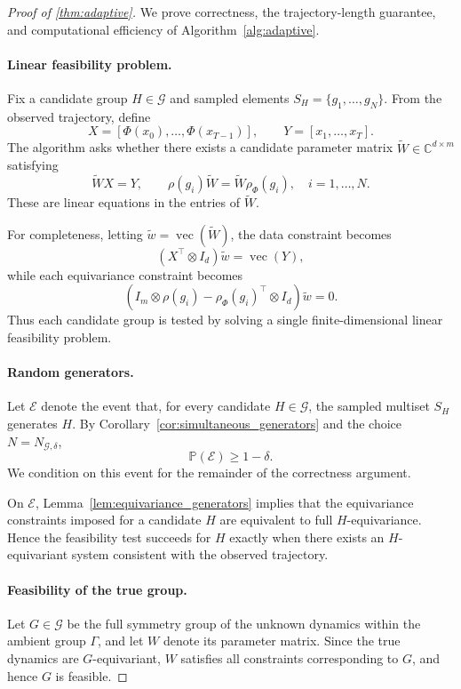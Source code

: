 \documentclass[11pt]{article}
\theoremstyle{plain}
\theoremstyle{definition}
\theoremstyle{remark}
\begin{document}
\begin{proof}[Proof of \cref{thm:adaptive}]
We prove correctness, the trajectory-length guarantee, and computational
efficiency of Algorithm~\ref{alg:adaptive}.

\paragraph{Linear feasibility problem.}
Fix a candidate group \(H\in\mathcal G\) and sampled elements
\(S_H=\{g_1,\ldots,g_N\}\). From the observed trajectory, define
\[
X=[\Phi(x_0),\ldots,\Phi(x_{T-1})],
\qquad
Y=[x_1,\ldots,x_T].
\]
The algorithm asks whether there exists a candidate parameter matrix
\(\widetilde W\in\mathbb C^{d\times m}\) satisfying
\[
\widetilde W X=Y,
\qquad
\rho(g_i)\widetilde W
=
\widetilde W\rho_\Phi(g_i),
\quad i=1,\ldots,N.
\]
These are linear equations in the entries of \(\widetilde W\).

For completeness, letting
\(\widetilde w=\operatorname{vec}(\widetilde W)\), the data constraint becomes
\[
(X^\top\otimes I_d)\widetilde w=\operatorname{vec}(Y),
\]
while each equivariance constraint becomes
\[
\left(
I_m\otimes\rho(g_i)
-
\rho_\Phi(g_i)^\top\otimes I_d
\right)\widetilde w=0.
\]
Thus each candidate group is tested by solving a single finite-dimensional
linear feasibility problem.

\paragraph{Random generators.}
Let \(\mathcal E\) denote the event that, for every candidate
\(H\in\mathcal G\), the sampled multiset \(S_H\) generates \(H\).
By Corollary~\ref{cor:simultaneous_generators} and the choice
\(N=N_{\mathcal G,\delta}\),
\[
\mathbb P(\mathcal E)\ge1-\delta.
\]
We condition on this event for the remainder of the correctness argument.

On \(\mathcal E\), Lemma~\ref{lem:equivariance_generators} implies that the
equivariance constraints imposed for a candidate \(H\) are equivalent to full
\(H\)-equivariance. Hence the feasibility test succeeds for \(H\) exactly when
there exists an \(H\)-equivariant system consistent with the observed
trajectory.

\paragraph{Feasibility of the true group.}
Let \(G\in\mathcal G\) be the full symmetry group of the unknown dynamics
within the ambient group \(\Gamma\), and let \(W\) denote its parameter
matrix. Since the true dynamics are \(G\)-equivariant, \(W\) satisfies all
constraints corresponding to \(G\), and hence \(G\) is feasible.


\end{proof}
\end{document}
